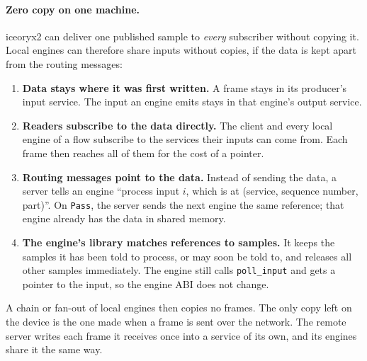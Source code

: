 \documentclass[11pt]{article}
\newcommand{\code}[1]{\texttt{#1}}
\begin{document}
\paragraph{Zero copy on one machine.} iceoryx2 can deliver one published
sample to \emph{every} subscriber without copying it. Local engines can
therefore share inputs without copies, if the data is kept apart from the
routing messages:
\begin{enumerate}[nosep]
  \item \textbf{Data stays where it was first written.} A frame stays in its
        producer's input service. The input an engine emits stays in that
        engine's output service.
  \item \textbf{Readers subscribe to the data directly.} The client and every
        local engine of a flow subscribe to the services their inputs can come
        from. Each frame then reaches all of them for the cost of a pointer.
  \item \textbf{Routing messages point to the data.} Instead of sending the
        data, a server tells an engine ``process input $i$, which is at
        (service, sequence number, part)''. On \code{Pass}, the server sends
        the next engine the same reference; that engine already has the data
        in shared memory.
  \item \textbf{The engine's library matches references to samples.} It
        keeps the samples it has been told to process, or may soon be told
        to, and releases all other samples immediately. The engine still
        calls \code{poll\_input} and gets a pointer to the input, so the
        engine ABI does not change.
\end{enumerate}
A chain or fan-out of local engines then copies no frames. The only copy left
on the device is the one made when a frame is sent over the network. The
remote server writes each frame it receives once into a service of its own,
and its engines share it the same way.
\end{document}
